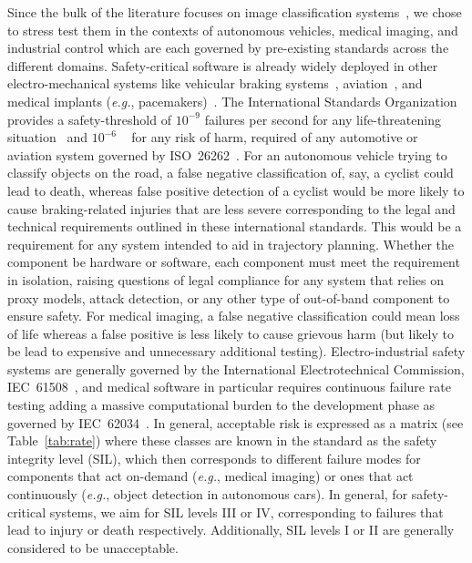 \documentclass[lettersize,journal]{IEEEtran}
\newcommand{\eg}{\textit{e.g.}\xspace}
\begin{document}
Since the bulk of the literature focuses on image classification systems~\cite{dohmatob_generalized_2019, biggio_evasion_2013-1, bect_bayesian_2017, chakraborty_adversarial_2018, carlini_towards_2017, croce_reliable_2020}, we chose to stress test them in the contexts of autonomous vehicles, medical imaging, and industrial control which are each governed by pre-existing standards across the different domains. Safety-critical software is already widely deployed in other electro-mechanical systems like vehicular braking systems~\cite{braking}, aviation~\cite{aviation}, and medical implants (\eg, pacemakers)~\cite{tuan2010modeling}. The International Standards Organization provides a safety-threshold of $10^{-9}$ failures per second for any life-threatening situation~\cite{iso26262} and $10^{-6}$ ~\cite{iso26262} for any risk of harm, required of any automotive or aviation system governed by ISO~26262~\cite{iso26262}. For an autonomous vehicle trying to classify objects on the road, a false negative classification of, say, a cyclist could lead to death, whereas false positive detection of a cyclist would be more likely to cause braking-related injuries that are less severe corresponding to the legal and technical requirements outlined in these international standards. This would be a requirement for any system intended to aid in trajectory planning. Whether the component be hardware or software, each component must meet the requirement in isolation, raising questions of legal compliance for any system that relies on proxy models, attack detection, or any other type of out-of-band component to ensure safety. For medical imaging, a false negative classification could mean loss of life whereas a false positive is less likely to cause grievous harm (but likely to be lead to expensive and unnecessary additional testing).  Electro-industrial safety systems are generally governed by the International Electrotechnical Commission, IEC~61508~\cite{IEC61508}, and medical software in particular requires continuous failure rate testing adding a massive computational burden to the development phase as governed by IEC~62034~\cite{IEC62034}. In general, acceptable risk is expressed as a matrix (see Table~\ref{tab:rate}) where these classes are known in the standard as the safety integrity level (SIL), which then corresponds to different failure modes for components that act on-demand (\eg, medical imaging) or ones that act continuously (\eg, object detection in autonomous cars). In general, for safety-critical systems, we aim for SIL levels III or IV, corresponding to failures that lead to injury or death respectively. Additionally, SIL levels I or II are generally considered to be unacceptable.
\end{document}

